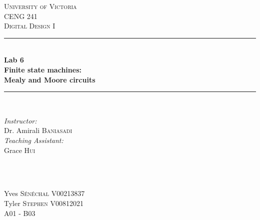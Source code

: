 \documentclass[11pt]{article}
\newcommand{\HRule}{\rule{\linewidth}{0.5mm}}
\begin{document}

\begin{titlepage}

\center
 
\textsc{\LARGE University of Victoria}\\[1cm] 	%
\textsc{\Large CENG 241}\\[0.5cm] 			%
\textsc{\large Digital Design I}\\[0.5cm] 		%


\HRule \\[0.4cm]
{\huge \bfseries Lab 6 \\ Finite state machines: \\Mealy and Moore circuits}\\[0.2cm] %
\HRule \\[1.5cm]
 
 
\begin{minipage}{0.7\textwidth}
\begin{flushleft} 

\large\emph{Instructor:} \\
Dr. Amirali \textsc{Baniasadi} \\
\vspace{12 pt}
\emph{Teaching Assistant:} \\
Grace \textsc{Hui}

\end{flushleft}
\end{minipage}
~
\begin{minipage}{0.1\textwidth}
\begin{flushright} \large
\vspace{12 pt}
\end{flushright}
\end{minipage}\\[2cm]


\Large Yves \textsc{S\'{e}n\'{e}chal}
\large V00213837	\\
\Large Tyler \textsc{Stephen}
\large V00812021	\\
A01 - B03\\[1.5cm] 



\end{titlepage}
\end{document}
